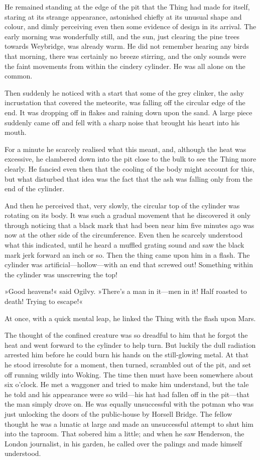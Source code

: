 He remained standing at the edge of the pit that the Thing had made for itself, staring at its strange appearance, astonished chiefly at its unusual shape and colour, and dimly perceiving even then some evidence of design in its arrival. The early morning was wonderfully still, and the sun, just clearing the pine trees towards Weybridge, was already warm. He did not remember hearing any birds that morning, there was certainly no breeze stirring, and the only sounds were the faint movements from within the cindery cylinder. He was all alone on the common.

Then suddenly he noticed with a start that some of the grey clinker, the ashy incrustation that covered the meteorite, was falling off the circular edge of the end. It was dropping off in flakes and raining down upon the sand. A large piece suddenly came off and fell with a sharp noise that brought his heart into his mouth.

For a minute he scarcely realised what this meant, and, although the heat was excessive, he clambered down into the pit close to the bulk to see the Thing more clearly. He fancied even then that the cooling of the body might account for this, but what disturbed that idea was the fact that the ash was falling only from the end of the cylinder.

And then he perceived that, very slowly, the circular top of the cylinder was rotating on its body. It was such a gradual movement that he discovered it only through noticing that a black mark that had been near him five minutes ago was now at the other side of the circumference. Even then he scarcely understood what this indicated, until he heard a muffled grating sound and saw the black mark jerk forward an inch or so. Then the thing came upon him in a flash. The cylinder was artificial—hollow—with an end that screwed out! Something within the cylinder was unscrewing the top!

»Good heavens!« said Ogilvy. »There's a man in it—men in it! Half roasted to death! Trying to escape!«

At once, with a quick mental leap, he linked the Thing with the flash upon Mars.

The thought of the confined creature was so dreadful to him that he forgot the heat and went forward to the cylinder to help turn. But luckily the dull radiation arrested him before he could burn his hands on the still-glowing metal. At that he stood irresolute for a moment, then turned, scrambled out of the pit, and set off running wildly into Woking. The time then must have been somewhere about six o'clock. He met a waggoner and tried to make him understand, but the tale he told and his appearance were so wild—his hat had fallen off in the pit—that the man simply drove on. He was equally unsuccessful with the potman who was just unlocking the doors of the public-house by Horsell Bridge. The fellow thought he was a lunatic at large and made an unsuccessful attempt to shut him into the taproom. That sobered him a little; and when he saw Henderson, the London journalist, in his garden, he called over the palings and made himself understood.

